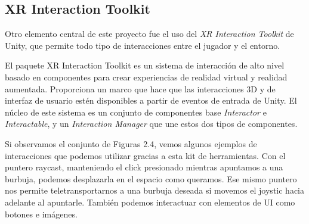 \subsection{XR Interaction Toolkit}

Otro elemento central de este proyecto fue el uso del \textit{XR Interaction Toolkit} de Unity, que permite todo tipo de interacciones entre el jugador y el entorno.

El paquete XR Interaction Toolkit es un sistema de interacción de alto nivel basado en componentes para crear experiencias de realidad virtual y realidad aumentada. Proporciona un marco que hace que las interacciones 3D y de interfaz de usuario estén disponibles a partir de eventos de entrada de Unity. El núcleo de este sistema es un conjunto de componentes base \textit{Interactor} e \textit{Interactable}, y un \textit{Interaction Manager} que une estos dos tipos de componentes. \cite[]{XRInteraction}

Si observamos el conjunto de Figuras 2.4, vemos algunos ejemplos de interacciones que podemos utilizar gracias a esta kit de herramientas. Con el puntero raycast, manteniendo el click presionado mientras apuntamos a una burbuja, podemos desplazarla en el espacio como queramos. Ese mismo puntero nos permite teletransportarnos a una burbuja deseada si movemos el joystic hacia adelante al apuntarle. También podemos interactuar con elementos de UI como botones e imágenes. 

